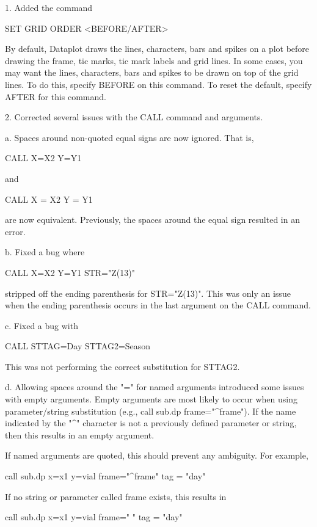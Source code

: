  1. Added the command

      SET GRID ORDER <BEFORE/AFTER>

    By default, Dataplot draws the lines, characters, bars and
    spikes on a plot before drawing the frame, tic marks, tic mark
    labels and grid lines.  In some cases, you may want the lines,
    characters, bars and spikes to be drawn on top of the grid lines.
    To do this, specify BEFORE on this command.  To reset the default,
    specify AFTER for this command.

 2. Corrected several issues with the CALL command and arguments.

    a. Spaces around non-quoted equal signs are now ignored.  That is,

           CALL X=X2 Y=Y1

        and

           CALL X = X2 Y = Y1

        are now equivalent.  Previously, the spaces around the equal
        sign resulted in an error.

    b. Fixed a bug where

           CALL X=X2 Y=Y1 STR="Z(13)"

       stripped off the ending parenthesis for STR="Z(13)".  This was
       only an issue when the ending parenthesis occurs in the last
       argument on the CALL command.

    c. Fixed a bug with

           CALL STTAG=Day STTAG2=Season

        This was not performing the correct substitution for STTAG2.

     d. Allowing spaces around the "=" for named arguments introduced
        some issues with empty arguments.  Empty arguments are most
        likely to occur when using parameter/string substitution
        (e.g., call sub.dp frame="^frame").  If the name indicated by
        the "^" character is not a previously defined parameter or
        string, then this results in an empty argument.

        If named arguments are quoted, this should prevent any
        ambiguity.  For example,

            call sub.dp   x=x1  y=vial  frame="^frame" tag = "day"

        If no string or parameter called frame exists, this results in

            call sub.dp   x=x1  y=vial  frame=" " tag = "day"

